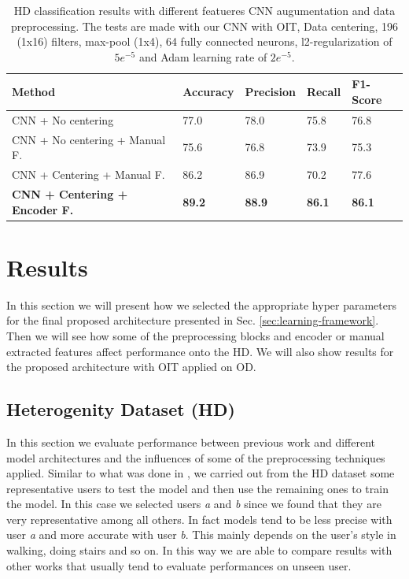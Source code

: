 
\begin{table}[t]
	\begin{center}
		\begin{tabular}{ p{7cm}p{2cm}p{2cm}p{2cm}p{2cm} }
			\hline
			Method & Accuracy & Precision & Recall & F1-Score \\
			\hline
			CNN + No centering & 77.0 & 78.0 & 75.8 & 76.8 \\
			CNN + No centering + Manual F. & 75.6 & 76.8 & 73.9 & 75.3 \\
			CNN + Centering + Manual F. & 86.2 & 86.9 & 70.2 & 77.6 \\
			\textbf{CNN + Centering + Encoder F.} & \textbf{89.2} & \textbf{88.9} &  \textbf{86.1} & \textbf{86.1} \\
			\hline
		\end{tabular}
		\caption{\label{tab:model-performance} HD classification results with different featueres CNN augumentation and data preprocessing. The tests are made with our CNN with OIT, Data centering, 196 (1x16) filters, max-pool (1x4), 64 fully connected neurons, l2-regularization of $5e^{-5}$ and Adam learning rate of $2e^{-5}$.}
	\end{center}
\end{table}

\section{Results}
\label{sec:results}

In this section we will present how we selected the appropriate hyper
parameters for the final proposed architecture presented in
Sec. \ref{sec:learning-framework}. Then we will see how some of the
preprocessing blocks and encoder or manual extracted features affect
performance onto the HD. We will also show results
for the proposed architecture with OIT applied on OD.

\subsection{Heterogenity Dataset (HD)}

In this section we evaluate performance between previous work and
different model architectures and the influences of some of the
preprocessing techniques applied. Similar to what was done in
\cite{ignatov2018real}, we carried out from the HD dataset some
representative users to test the model and then use the remaining ones
to train the model. In this case we selected users \textit{a} and
\textit{b} since we found that they are very representative among all
others. In fact models tend to be less precise with user \textit{a}
and more accurate with user \textit{b}. This mainly depends on the
user's style in walking, doing stairs and so on. In this way we are
able to compare results with other works that usually tend to evaluate
performances on unseen user.

